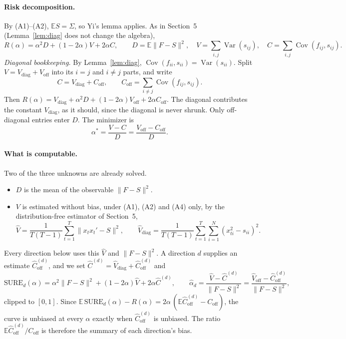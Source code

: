 \documentclass[11pt]{article}
\theoremstyle{remark}
\begin{document}
\paragraph{Risk decomposition.}
By (A1)--(A2), $\mathbb{E}S = \Sigma$, so Yi's lemma \citep{yi2013} applies. As in Section~5 (Lemma~\ref{lem:diag} does not change the algebra),
\[
  R(\alpha) = \alpha^2 D + (1 - 2\alpha)V + 2\alpha C, \qquad
  D = \mathbb{E}\|F - S\|^2,\quad V = \sum_{i,j}\operatorname{Var}(s_{ij}),\quad C = \sum_{i,j}\operatorname{Cov}(f_{ij}, s_{ij}).
\]
\emph{Diagonal bookkeeping.} By Lemma~\ref{lem:diag}, $\operatorname{Cov}(f_{ii}, s_{ii}) = \operatorname{Var}(s_{ii})$. Split $V = V_{\mathrm{diag}} + V_{\mathrm{off}}$ into its $i = j$ and $i \ne j$ parts, and write
\[
  C = V_{\mathrm{diag}} + C_{\mathrm{off}}, \qquad C_{\mathrm{off}} = \sum_{i \ne j}\operatorname{Cov}(f_{ij}, s_{ij}).
\]
Then $R(\alpha) = V_{\mathrm{diag}} + \alpha^2 D + (1 - 2\alpha)V_{\mathrm{off}} + 2\alpha C_{\mathrm{off}}$. The diagonal contributes the constant $V_{\mathrm{diag}}$, as it should, since the diagonal is never shrunk. Only off-diagonal entries enter $D$. The minimizer is
\[
  \alpha^* = \frac{V - C}{D} = \frac{V_{\mathrm{off}} - C_{\mathrm{off}}}{D}.
\]

\paragraph{What is computable.}
Two of the three unknowns are already solved.
\begin{itemize}
  \item $D$ is the mean of the observable $\|F - S\|^2$.
  \item $V$ is estimated without bias, under (A1), (A2) and (A4) only, by the distribution-free estimator of Section~5,
  \[
    \hat V = \frac{1}{T(T-1)}\sum_{t=1}^T\|x_tx_t' - S\|^2, \qquad
    \hat V_{\mathrm{diag}} = \frac{1}{T(T-1)}\sum_{t=1}^T\sum_{i=1}^N\left(x_{ti}^2 - s_{ii}\right)^2 .
  \]
\end{itemize}
Every direction below uses this $\hat V$ and $\|F - S\|^2$. A direction $d$ supplies an estimate $\hat C_{\mathrm{off}}^{(d)}$, and we set $\hat C^{(d)} = \hat V_{\mathrm{diag}} + \hat C_{\mathrm{off}}^{(d)}$ and
\[
  \mathrm{SURE}_d(\alpha) = \alpha^2\|F - S\|^2 + (1 - 2\alpha)\hat V + 2\alpha\hat C^{(d)}, \qquad
  \hat\alpha_d = \frac{\hat V - \hat C^{(d)}}{\|F - S\|^2} = \frac{\hat V_{\mathrm{off}} - \hat C_{\mathrm{off}}^{(d)}}{\|F - S\|^2},
\]
clipped to $[0,1]$. Since $\mathbb{E}\,\mathrm{SURE}_d(\alpha) - R(\alpha) = 2\alpha\,(\mathbb{E}\hat C_{\mathrm{off}}^{(d)} - C_{\mathrm{off}})$, the curve is unbiased at every $\alpha$ exactly when $\hat C_{\mathrm{off}}^{(d)}$ is unbiased. The ratio $\mathbb{E}\hat C^{(d)}_{\mathrm{off}}/C_{\mathrm{off}}$ is therefore the summary of each direction's bias.
\end{document}
